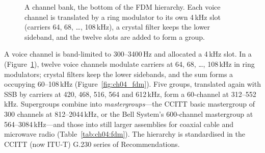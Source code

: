 \begin{figure}[htbp]\centering
{}
\caption{A channel bank, the bottom of the FDM hierarchy. Each voice channel is translated by a ring modulator
to its own 4\,kHz slot (carriers 64, 68, \dots, 108\,kHz), a crystal filter keeps the lower sideband, and the
twelve slots are added to form a group.}
\label{fig:ch04_channelbank}
\end{figure}

A voice channel is band-limited to 300--3400\,Hz and allocated a 4\,kHz slot. In a 
(Figure~\ref{fig:ch04_channelbank}), twelve
voice channels modulate carriers at 64, 68, \dots, 108\,kHz in ring modulators; crystal filters keep the lower
sidebands, and the sum forms a  occupying 60--108\,kHz (Figure~\ref{fig:ch04_fdm}). Five groups,
translated again with SSB by carriers at 420, 468, 516, 564 and 612\,kHz, form a 60-channel  at
312--552\,kHz. Supergroups combine into \emph{mastergroups}---the CCITT basic mastergroup of 300 channels at
812--2044\,kHz, or the Bell System's 600-channel mastergroup at 564--3084\,kHz---and those into still larger
assemblies for coaxial cable and microwave radio (Table~\ref{tab:ch04:fdm}). The hierarchy is standardised in
the CCITT (now ITU-T) G.230 series of Recommendations. 

